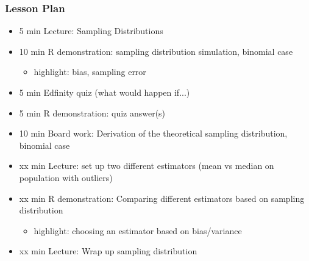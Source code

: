 

\begin{frame}
\frametitle{Lesson Plan}
\begin{itemize}
    \item 5 min Lecture: Sampling Distributions
    \item 10 min R demonstration: sampling distribution simulation, binomial case
    \begin{itemize}
        \item  highlight: bias, sampling error
    \end{itemize}
    \item 5 min Edfinity quiz (what would happen if...)
    \item 5 min R demonstration: quiz answer(s)
    \item 10 min Board work: Derivation of the theoretical sampling distribution, binomial case
    \item xx min Lecture: set up two different estimators (mean vs median on population with outliers) 
    \item xx min R demonstration: Comparing different estimators based on sampling distribution 
    \begin{itemize}
        \item  highlight: choosing an estimator based on bias/variance
    \end{itemize}
    \item xx min Lecture: Wrap up sampling distribution
\end{itemize}
\end{frame}

